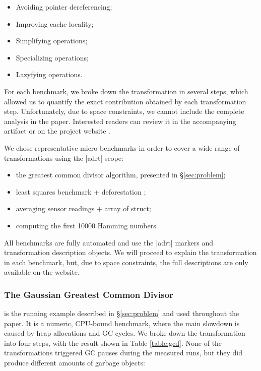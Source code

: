 \begin{itemize}
  \item Avoiding pointer dereferencing;
  \item Improving cache locality;
  \item Simplifying operations;
  \item Specializing operations;
  \item Lazyfying operations.
\end{itemize}


\noindent
For each benchmark, we broke down the transformation in several steps, which allowed us to quantify the exact contribution obtained by each transformation step. Unfortunately, due to space constraints, we cannot include the complete analysis in the paper. Interested readers can review it in the accompanying artifact or on the project website \cite{ildl-plugin-wiki}.


\noindent
We chose representative micro-benchmarks in order to cover a wide range of transformations using the |adrt| scope:

\begin{itemize}
\item the greatest common divisor algorithm, presented in \S\ref{sec:problem};
\item least squares benchmark + deforestation \cite{wadler-deforestation};
\item averaging sensor readings + array of struct;
\item computing the first 10000 Hamming numbers.
\end{itemize}


\noindent
All benchmarks are fully automated and use the |adrt| markers and transformation description objects. We will proceed to explain the transformation in each benchmark, but, due to space constraints, the full descriptions are only available on the website.

\subsubsection*{The Gaussian Greatest Common Divisor}
is the running example described in \S\ref{sec:problem} and used throughout the paper. It is a numeric, CPU-bound benchmark, where the main slowdown is caused by heap allocations and GC cycles. We broke down the transformation into four steps, with the result shown in Table \ref{table:gcd}. None of the transformations triggered GC pauses during the measured runs, but they did produce different amounts of garbage objects:


